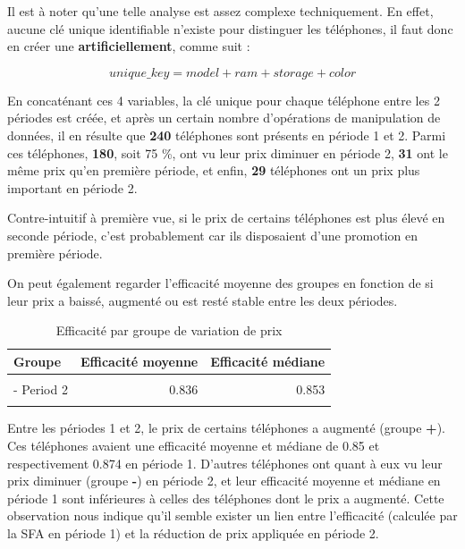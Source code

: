 \documentclass[
  12pt,
]{report}
\begin{document}
Il est à noter qu'une telle analyse est assez complexe techniquement. En
effet, aucune clé unique identifiable n'existe pour distinguer les
téléphones, il faut donc en créer une \textbf{artificiellement}, comme
suit :

\[
unique\_{key} = model + ram + storage + color
\]

En concaténant ces 4 variables, la clé unique pour chaque téléphone
entre les 2 périodes est créée, et après un certain nombre d'opérations
de manipulation de données, il en résulte que \textbf{240} téléphones
sont présents en période 1 et 2. Parmi ces téléphones, \textbf{180},
soit 75 \%, ont vu leur prix diminuer en période 2, \textbf{31} ont le
même prix qu'en première période, et enfin, \textbf{29} téléphones ont
un prix plus important en période 2.

Contre-intuitif à première vue, si le prix de certains téléphones est
plus élevé en seconde période, c'est probablement car ils disposaient
d'une promotion en première période.

On peut également regarder l'efficacité moyenne des groupes en fonction
de si leur prix a baissé, augmenté ou est resté stable entre les deux
périodes.

\begin{table}[!h]
\centering
\caption{\label{tab:unnamed-chunk-20}Efficacité par groupe de variation de prix}
\centering
\begin{tabular}[t]{lrr}
\toprule
\textbf{Groupe} & \textbf{Efficacité moyenne} & \textbf{Efficacité médiane}\\
\midrule
\cellcolor{gray!10}{+ Period 2} & \cellcolor{gray!10}{0.850} & \cellcolor{gray!10}{0.874}\\
- Period 2 & 0.836 & 0.853\\
\cellcolor{gray!10}{= Period 2} & \cellcolor{gray!10}{0.867} & \cellcolor{gray!10}{0.881}\\
\bottomrule
\end{tabular}
\end{table}

Entre les périodes 1 et 2, le prix de certains téléphones a augmenté
(groupe \textbf{+}). Ces téléphones avaient une efficacité moyenne et
médiane de 0.85 et respectivement 0.874 en période 1. D'autres
téléphones ont quant à eux vu leur prix diminuer (groupe \textbf{-}) en
période 2, et leur efficacité moyenne et médiane en période 1 sont
inférieures à celles des téléphones dont le prix a augmenté. Cette
observation nous indique qu'il semble exister un lien entre l'efficacité
(calculée par la SFA en période 1) et la réduction de prix appliquée en
période 2.
\end{document}
